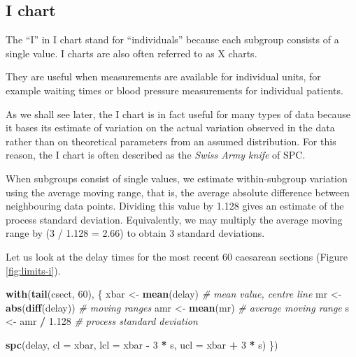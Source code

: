 \documentclass[
]{book}
\newenvironment{Shaded}{\begin{snugshade}}{\end{snugshade}}
\newcommand{\AttributeTok}[1]{\textcolor[rgb]{0.13,0.29,0.53}{#1}}
\newcommand{\CommentTok}[1]{\textcolor[rgb]{0.56,0.35,0.01}{\textit{#1}}}
\newcommand{\DecValTok}[1]{\textcolor[rgb]{0.00,0.00,0.81}{#1}}
\newcommand{\FloatTok}[1]{\textcolor[rgb]{0.00,0.00,0.81}{#1}}
\newcommand{\FunctionTok}[1]{\textcolor[rgb]{0.13,0.29,0.53}{\textbf{#1}}}
\newcommand{\NormalTok}[1]{#1}
\newcommand{\OtherTok}[1]{\textcolor[rgb]{0.56,0.35,0.01}{#1}}
\newcommand{\SpecialCharTok}[1]{\textcolor[rgb]{0.81,0.36,0.00}{\textbf{#1}}}
\begin{document}
\subsection{I chart}\label{i-chart}

The ``I'' in I chart stand for ``individuals'' because each subgroup consists of a single value. I charts are also often referred to as X charts.

They are useful when measurements are available for individual units, for example waiting times or blood pressure measurements for individual patients.

As we shall see later, the I chart is in fact useful for many types of data because it bases its estimate of variation on the actual variation observed in the data rather than on theoretical parameters from an assumed distribution. For this reason, the I chart is often described as the \emph{Swiss Army knife} of SPC.

When subgroups consist of single values, we estimate within-subgroup variation using the average moving range, that is, the average absolute difference between neighbouring data points. Dividing this value by 1.128 gives an estimate of the process standard deviation. Equivalently, we may multiply the average moving range by (3 / 1.128 = 2.66) to obtain 3 standard deviations.

Let us look at the delay times for the most recent 60 caesarean sections (Figure \ref{fig:limits-i}).

\begin{Shaded}
\begin{Highlighting}[]
\FunctionTok{with}\NormalTok{(}\FunctionTok{tail}\NormalTok{(csect, }\DecValTok{60}\NormalTok{), \{}
\NormalTok{  xbar }\OtherTok{\textless{}{-}} \FunctionTok{mean}\NormalTok{(delay)      }\CommentTok{\# mean value, centre line}
\NormalTok{  mr   }\OtherTok{\textless{}{-}} \FunctionTok{abs}\NormalTok{(}\FunctionTok{diff}\NormalTok{(delay)) }\CommentTok{\# moving ranges}
\NormalTok{  amr  }\OtherTok{\textless{}{-}} \FunctionTok{mean}\NormalTok{(mr)         }\CommentTok{\# average moving range}
\NormalTok{  s    }\OtherTok{\textless{}{-}}\NormalTok{ amr }\SpecialCharTok{/} \FloatTok{1.128}      \CommentTok{\# process standard deviation}
  
  \FunctionTok{spc}\NormalTok{(delay,}
      \AttributeTok{cl  =}\NormalTok{ xbar,}
      \AttributeTok{lcl =}\NormalTok{ xbar }\SpecialCharTok{{-}} \DecValTok{3} \SpecialCharTok{*}\NormalTok{ s,}
      \AttributeTok{ucl =}\NormalTok{ xbar }\SpecialCharTok{+} \DecValTok{3} \SpecialCharTok{*}\NormalTok{ s)}
\NormalTok{\})}
\end{Highlighting}
\end{Shaded}
\end{document}

